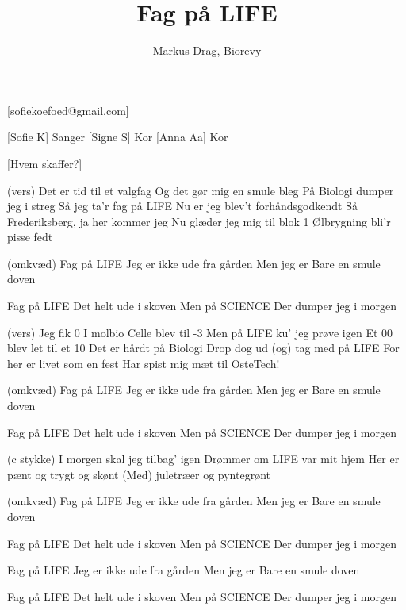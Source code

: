 \documentclass[a4paper,12pt]{article}
\title{Fag på LIFE}
\author{Markus Drag, Biorevy}
\begin{document}
\maketitle

\begin{texxers}
	[sofiekoefoed@gmail.com]
\end{texxers}

\begin{roles}
	[Sofie K] Sanger
	[Signe S] Kor
	[Anna Aa] Kor
\end{roles}


\begin{props}
	[Hvem skaffer?] 
\end{props}

\begin{song}

(vers)
Det er tid til et valgfag
Og det gør mig en smule bleg
På Biologi dumper jeg i streg
Så jeg ta'r fag på LIFE
Nu er jeg blev't forhåndsgodkendt
Så Frederiksberg, ja her kommer jeg
Nu glæder jeg mig til blok 1
Ølbrygning bli'r pisse fedt

 (omkvæd) 
Fag på LIFE
Jeg er ikke ude fra gården
Men jeg er
Bare en smule doven

Fag på LIFE
Det helt ude i skoven
Men på SCIENCE
Der dumper jeg i morgen

(vers)
Jeg fik 0 I molbio
Celle blev til -3
Men på LIFE ku' jeg prøve igen
Et 00 blev let til et 10
Det er hårdt på Biologi
Drop dog ud (og) tag med på LIFE
For her er livet som en fest
Har spist mig mæt til OsteTech!

 (omkvæd) 
Fag på LIFE
Jeg er ikke ude fra gården
Men jeg er
Bare en smule doven

Fag på LIFE
Det helt ude i skoven
Men på SCIENCE
Der dumper jeg i morgen

(c stykke) 
I morgen skal jeg tilbag' igen
Drømmer om LIFE var mit hjem
Her er pænt og trygt og skønt
(Med) juletræer og pyntegrønt

 (omkvæd) 
Fag på LIFE
Jeg er ikke ude fra gården
Men jeg er
Bare en smule doven

Fag på LIFE
Det helt ude i skoven
Men på SCIENCE
Der dumper jeg i morgen

Fag på LIFE
Jeg er ikke ude fra gården
Men jeg er
Bare en smule doven

Fag på LIFE
Det helt ude i skoven
Men på SCIENCE
Der dumper jeg i morgen
\end{song}
\end{document}
